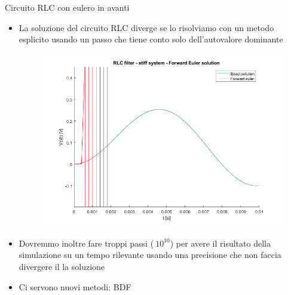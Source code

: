 \documentclass[aspectratio=169, 10pt, handout,usenames,dvipsnames]{beamer}
\begin{document}
\begin{frame}{Circuito RLC con eulero in avanti}
\begin{itemize}
    \item La soluzione del circuito RLC diverge se lo risolviamo con un metodo esplicito usando un passo che tiene conto solo dell'autovalore dominante
        \begin{figure}
        \centering
        \includegraphics[width=.75\linewidth]{rlc_forward_euler.png}
        \label{fig:my_label}
        \end{figure}
\item Dovremmo inoltre fare troppi passi ($~10^{10}$) per avere il risultato della simulazione su un tempo rilevante usando una precisione che non faccia divergere il la soluzione

\item Ci servono nuovi metodi: BDF
\end{itemize}
\end{frame}
\end{document}
